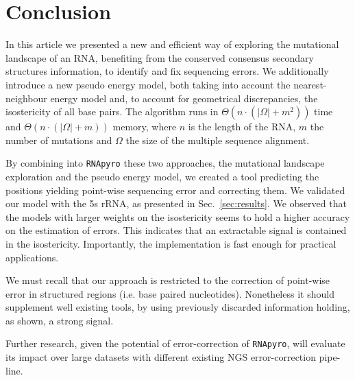 \section{Conclusion}
\label{sec:conclusion}

In this article we presented a new and efficient way of
exploring the mutational landscape of an RNA, benefiting from the
 conserved consensus secondary structures  information,
to identify and fix sequencing errors. We additionally introduce a new
 pseudo energy model, both taking into account the nearest-neighbour energy model 
and, to account for geometrical discrepancies,  the isostericity of all base pairs. 
The algorithm runs in  $\Theta(n\cdot(|\Omega|+m^2))$ time and $\Theta(n\cdot(|\Omega|+m))$ memory, where $n$ is the length of the RNA,
$m$ the number of mutations and $\Omega$ the size of the multiple sequence alignment.


By combining  into \texttt{RNApyro} these two approaches,  the 
mutational landscape exploration and the pseudo energy model,
 we created a tool predicting the positions
 yielding point-wise sequencing error and correcting them.
We validated our model with the 5s rRNA,
as presented in Sec.~\ref{sec:results}.
We observed that the models
with larger weights on the
isostericity seems to hold a higher accuracy on the estimation of errors.
This indicates that an extractable signal is contained in the isostericity.
Importantly, the implementation is fast enough for practical applications. 


We must recall that our approach is restricted to
 the correction of point-wise error in structured regions (i.e. base paired nucleotides).
 Nonetheless it should supplement well existing tools, by using previously discarded
information holding, as shown, a strong signal.

Further research, given the potential of error-correction of \texttt{RNApyro}, 
will evaluate its impact over large datasets with different existing
  NGS error-correction pipe-line.